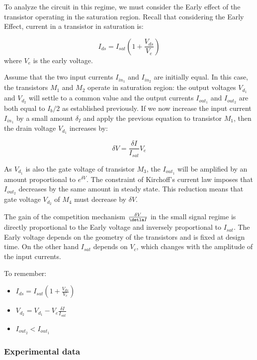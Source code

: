 To analyze the circuit in this regime, we must consider the Early effect of the transistor operating in the saturation region. Recall that considering the Early Effect, current in a transistor in saturation is: 

\begin{equation}
    I_{ds} = I_{sat}(1 + \frac{V_{ds}}{V_e})
\end{equation}
where $V_e$ is the early voltage. 

Assume that the two input currents $I_{in_1}$ and $I_{in_2}$ are initially equal. In this case, the transistors $M_1$ and $M_2$ operate in saturation region: the output voltages $V_d_1$ and $V_d_2$ will settle to a common value and the output currents $I_{out_1}$ and $I_{out_2}$ are both equal to $I_b/2$ as established previously. If we now increase the input current $I_{in_1}$ by a small amount $\delta_I$ and apply the previous equation to transistor $M_1$, then the drain voltage $V_d_1$ increases by: 

\begin{equation}
    \delta V = \frac{\delta I}{I_{sat}}V_e
\end{equation}

As $V_d_1$ is also the gate voltage of transistor $M_3$, the $I_{out_1}$ will be amplified by an amount proportional to $e^{\delta V}$. The constraint of Kirchoff's current law imposes that $I_{out_2}$ decreases by the same amount in steady state. This reduction means that gate voltage $V_d_2$ of $M_4$ must decrease by $\delta V$. 

The gain of the competition mechanism $\frac{\delta V}{\detla I}$ in the small signal regime is directly proportional to the Early voltage and inversely proportional to $I_{sat}$. The Early voltage depends on the geometry of the transistors and is fixed at design time. On the other hand $I_{sat}$ depends on $V_c$, which changes with the amplitude of the input currents. 

To remember: 

\begin{itemize}
    \item $I_{ds} = I_{sat}(1 + \frac{V_{ds}}{V_e})$
    \item $V_d_2 = V_d_1 - V_e \frac{\delta I}{I_{sat}}$
    \item $I_{out}_2 < I_{out}_1$
\end{itemize}

\subsubsection{Experimental data}

